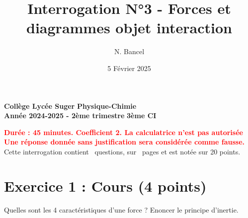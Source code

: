 \documentclass{exam}
\title{Interrogation N°3 - Forces et diagrammes objet interaction}
\author{N. Bancel}
\date{5 Février 2025}
\begin{document}
\textbf{Collège Lycée Suger}
\hfill
\textbf{Physique-Chimie} \\

\textbf{Année 2024-2025 - 2ème trimestre}
\hfill
\textbf{3ème CI} \par

{\let\newpage\relax\maketitle}

\begin{center}
\textbf{\textcolor{red}{Durée : 45 minutes. Coefficient 2. La calculatrice n'est pas autorisée}} \\
\textbf{\textcolor{red}{Une réponse donnée sans justification sera considérée comme fausse.}} \\
Cette interrogation contient \numquestions\ questions, sur \numpages\ pages et est notée sur 20 points. 

\end{center}

\section*{Exercice 1 : Cours (4 points)}

\vspace{1em}

\begin{questions}
  \question[2] Quelles sont les 4 caractéristiques d'une force ?
  \question[2] Enoncer le principe d'inertie.
\end{questions}
\end{document}
